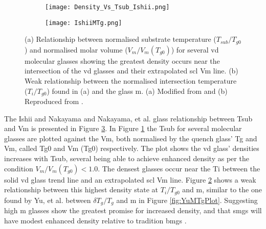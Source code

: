 \documentclass[a4paper,12pt,oneside]{report}%
\begin{document}
\begin{figure}[bp]
	\centering
	\begin{subfigure}[htbp]{0.75\textwidth}
		\texttt{[image: Density\_Vs\_Tsub\_Ishii.png]}
		\caption{}
		\label{fig:IshiiDensityTsub}
	\end{subfigure}
	\begin{subfigure}[htbp]{0.75\textwidth}
		\texttt{[image: IshiiMTg.png]}
		\caption{}
		\label{fig:IshiiMTg}
	\end{subfigure}
	\caption[(a) Relationship between normalised substrate temperature ($T_{sub}/T_{g0}$) and normalised molar volume ($V_{m}/V_{m} (T_{g0})$) for several \acrshort{vd} molecular glasses showing the greatest density occurs near the intersection of the \acrshort{vd} glasses and their extrapolated \acrshort{scl} \acrshort{Vm} line. (b) Weak relationship between the normalised intersection temperature ($T_{i}/T_{g0}$) found in (a) and the glass \acrfull{m}.]{(a) Relationship between normalised substrate temperature ($T_{sub}/T_{g0}$) and normalised molar volume ($V_{m}/V_{m} (T_{g0})$) for several \acrshort{vd} molecular glasses showing the greatest density occurs near the intersection of the \acrshort{vd} glasses and their extrapolated \acrshort{scl} \acrshort{Vm} line. (b) Weak relationship between the normalised intersection temperature ($T_{i}/T_{g0}$) found in (a) and the glass \acrfull{m}. (a) Modified from \cite{Ishii2014} and (b) Reproduced from \cite{Ishii2014}.}%
	\label{fig:IshiiTsubM}
\end{figure}


The Ishii and Nakayama \cite{Ishii2014} and Nakayama, et al. \cite{Nakayama2013} glass relationship between \gls{Tsub} and \gls{Vm} is presented in Figure \ref{fig:IshiiTsubM}. In Figure \ref{fig:IshiiDensityTsub} the \gls{Tsub} for several molecular glasses are plotted against the \gls{Vm}, both normalised by the quench glass' \gls{Tg} and \gls{Vm}, called \acrshort{Tg0} and \gls{Vm} (\acrshort{Tg0}) respectively. The plot shows the \gls{vd} glass' densities increases with \gls{Tsub}, several being able to achieve enhanced density as per the condition $V_{m}/V_{m} (T_{g0})<1.0$. The densest glasses occur near the \gls{Ti} between the solid \gls{vd} glass trend line and an extrapolated \gls{scl} \gls{Vm} line. Figure \ref{fig:IshiiMTg} shows a weak relationship between this highest density state at $T_{i}/T_{g0}$ and \gls{m}, similar to the one found by Yu, et al. \cite{Yu2013} between $\delta T_{g}/T_{g}$ and m in Figure \ref{fig:YuMTgPlot}. Suggesting high \gls{m} glasses show the greatest promise for increased density, and that \glspl{smg} will have modest enhanced density relative to tradition \glspl{bmg} \cite{Ishii2014, Nakayama2013}. 
\end{document}
